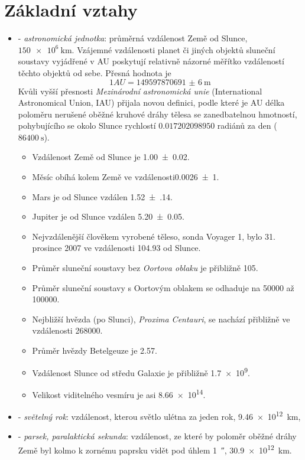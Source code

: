   \section{Základní vztahy}
    \begin{itemize}
      \item \wikiAU - \emph{astronomická jednotka}: průměrná vzdálenost Země od Slunce, 
      $\SI{150e6}{\km}$. Vzájemné vzdálenosti planet či jiných objektů sluneční soustavy 
      vy\-já\-dře\-né v AU poskytují relativně názorné měřítko vzdáleností těchto objektů od sebe. 
      Přesná hodnota je
      \begin{equation*}
        1 AU = \SI[multi-part-units = single]{149597870691(6)}{\m}
      \end{equation*}
      Kvůli vyšší přesnosti \emph{Mezinárodní astronomická unie} (International Astronomical 
      Union, IAU) přijala novou de\-fi\-ni\-ci, podle které je AU délka poloměru nerušené oběžné 
      kruhové dráhy tělesa se zanedbatelnou hmotností, pohybujícího se okolo Slunce rychlostí 
      \newline \(\num{0,017202098950}\) radiánů za den (\(\SI{86400}{\second}\)). 
        \begin{itemize}
          \item Vzdálenost Země od Slunce je \SI{1.00(2)}{\AU}.
          \item Měsíc obíhá kolem Země ve vzdálenosti\newline \SI{0,0026(1)}{\AU}.
          \item Mars je od Slunce vzdálen \SI{1.52(14)}{\AU}.
          \item Jupiter je od Slunce vzdálen \SI{5.20(5)}{\AU}.
          \item Nejvzdálenější člověkem vyrobené těleso, sonda \newline Voyager 1, bylo 31.
                prosince 2007 ve vzdálenosti \SI{104.93}{\AU} od Slunce.
          \item Průměr sluneční soustavy bez \emph{Oortova oblaku} je přibližně \SI{105}{\AU}.
          \item Průměr sluneční soustavy s Oortovým oblakem se odhaduje na \SI{50000}{\AU} až    
                \SI{100000}{\AU}.
          \item Nejbližší hvězda (po Slunci), \emph{Proxima Centauri}, se nachází přibližně ve 
                vzdálenosti \SI{268000}{\AU}.
          \item Průměr hvězdy Betelgeuze je \SI{2.57}{\AU}.
          \item Vzdálenost Slunce od středu Galaxie je přibližně \SI{1.7e9}{\AU}.
          \item Velikost viditelného vesmíru je asi \SI{8.66e14}{\AU}.
        \end{itemize}
      \item \textbf{\si{\lightyear}} - \emph{světelný rok}: vzdálenost, kterou světlo ulétna za    
            jeden rok, \SI{9.46e12}{\km},
      \item \textbf{\si{\parsec}} - \emph{parsek, paralaktická sekunda}: vzdálenost, ze které by  
            poloměr oběžné dráhy Země byl kolmo k zornému paprsku vidět pod úhlem 
            \SI{1}{\arcsecond}, 
            \SI{30.9e12}{\km}. 
    \end{itemize}